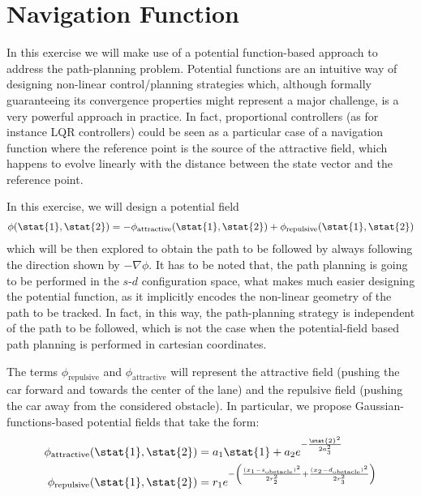 \setcounter{chapter}{3}
\chapter{Navigation Function}
In this exercise we will make use of a potential function-based approach to address the path-planning problem. 
Potential functions are an intuitive way of designing non-linear control/planning strategies which, although formally guaranteeing its convergence properties might represent a major challenge, is a very powerful approach in practice.
In fact, proportional controllers (as for instance LQR controllers) could be seen as a particular case of a navigation function where the reference point is the source of the attractive field, which happens to evolve linearly with the distance between the state vector and the reference point.\par
%
In this exercise, we will design a potential field 
%
\begin{align}
	\phi(\stat{1},\stat{2}) = - \phi_\text{attractive}(\stat{1},\stat{2}) + \phi_\text{repulsive}(\stat{1},\stat{2}) 
\end{align}
%
which will be then explored to obtain the path to be followed by always following the direction shown by $-\nabla \phi$.
It has to be noted that, the path planning is going to be performed in the $s$-$d$ configuration space, what makes much easier designing the potential function, as it implicitly encodes the non-linear geometry of the path to be tracked. 
In fact, in this way, the path-planning strategy is independent of the path to be followed, which is not the case when the potential-field based path planning is performed in cartesian coordinates.  
\par
%
The terms $\phi_\text{repulsive}$ and $\phi_\text{attractive}$ will represent the attractive field (pushing the car forward and towards the center of the lane) and the repulsive field (pushing the car away from the considered obstacle). 
In particular, we propose Gaussian-functions-based potential fields that take the form:
%
\begin{align}
	\phi_\text{attractive}(\stat{1},\stat{2}) & = a_1 \stat{1} + a_2 e^{ - \frac{\stat{2}^2}{2 a_3^2}} \label{eq:attractive}\\
	\phi_\text{repulsive}(\stat{1},\stat{2}) & = r_1 e^{ -\left( \frac{ (x_1-s_\text{obstacle})^2 }{2 r_2^2} + \frac{ (x_2-d_\text{obstacle})^2 }{2 r_3^2} \right) } \label{eq:repulsive}
\end{align}


